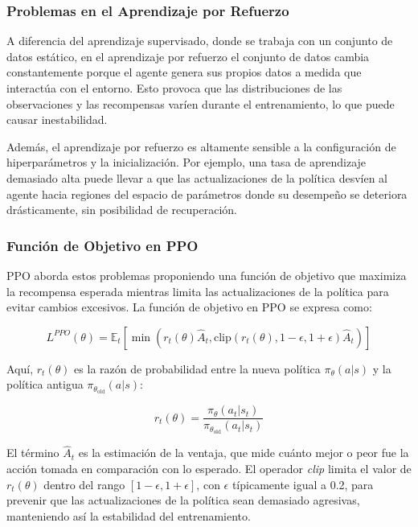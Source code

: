 \documentclass[a4paper,12pt, twoside]{report}
\begin{document}
\subsubsection{Problemas en el Aprendizaje por Refuerzo}

A diferencia del aprendizaje supervisado, donde se trabaja con un conjunto de datos estático, 
en el aprendizaje por refuerzo el conjunto de datos cambia constantemente porque el agente 
genera sus propios datos a medida que interactúa con el entorno. Esto provoca que las 
distribuciones de las observaciones y las recompensas varíen durante el entrenamiento, 
lo que puede causar inestabilidad.

Además, el aprendizaje por refuerzo es altamente sensible a la configuración de hiperparámetros 
y la inicialización. Por ejemplo, una tasa de aprendizaje demasiado alta puede llevar a que 
las actualizaciones de la política desvíen al agente hacia regiones del espacio de parámetros 
donde su desempeño se deteriora drásticamente, sin posibilidad de recuperación.

\subsubsection{Función de Objetivo en PPO}

PPO aborda estos problemas proponiendo una función de objetivo que maximiza la recompensa 
esperada mientras limita las actualizaciones de la política para evitar cambios excesivos. 
La función de objetivo en PPO se expresa como:

\[
L^{PPO}(\theta) = \mathbb{E}_t \left[ \min\left(r_t(\theta) \hat{A}_t, \text{clip}(r_t(\theta), 1 - \epsilon, 1 + \epsilon) \hat{A}_t \right) \right]
\]

Aquí, \( r_t(\theta) \) es la razón de probabilidad entre la nueva política \(\pi_\theta(a|s)\) 
y la política antigua \(\pi_{\theta_{\text{old}}}(a|s)\):

\[
r_t(\theta) = \frac{\pi_\theta(a_t|s_t)}{\pi_{\theta_{\text{old}}}(a_t|s_t)}
\]

El término \(\hat{A}_t\) es la estimación de la ventaja, que mide cuánto mejor o peor fue la 
acción tomada en comparación con lo esperado. El operador \textit{clip} limita el valor de 
\(r_t(\theta)\) dentro del rango \([1 - \epsilon, 1 + \epsilon]\), con \(\epsilon\) típicamente 
igual a 0.2, para prevenir que las actualizaciones de la política sean demasiado agresivas,
manteniendo así la estabilidad del entrenamiento.
\end{document}
